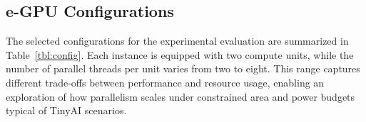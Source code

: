            \begin{table}[tp]
                \caption{Selected \mbox{e-GPU} configurations for our experiments. CU: Compute Unit.}
                \label{tbl:config}
                \centering
            \end{table}

        \subsection{e-GPU Configurations}
        
            The selected configurations for the experimental evaluation are summarized in Table~\ref{tbl:config}. Each instance is equipped with two compute units, while the number of parallel threads per unit varies from two to eight. This range captures different trade-offs between performance and resource usage, enabling an exploration of how parallelism scales under constrained area and power budgets typical of TinyAI scenarios.
        
